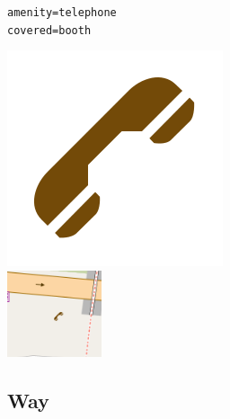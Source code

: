 \documentclass{beamer}
\begin{document}
\begin{frame}
\begin{center}
\begin{minipage}[b][0.6\textheight][c]{0.4\linewidth}
			\end{minipage}
			\begin{minipage}[b][0.6\textheight][c]{0.3\linewidth}
				\texttt{amenity=telephone}\\
				\texttt{covered=booth}
				\begin{center}
					\includegraphics[width=0.3\linewidth,height=0.3\textheight,keepaspectratio]{images/240px-Telephone.png}\\
					\vspace{0.25cm}
					\includegraphics[width=0.8\linewidth,height=0.8\textheight,keepaspectratio]{images/telephone.png}
				\end{center}
			\end{minipage}
		\end{center}
	\end{frame}
		
	\subsection{Way}
	
\end{document}
